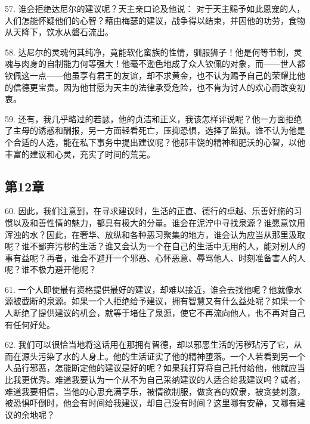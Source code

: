 57. 谁会拒绝达尼尔的建议呢？天主亲口论及他说： 对于天主赐予如此恩宠的人，人们怎能怀疑他们的心智？藉由梅瑟的建议，战争得以结束，并因他的功劳，食物从天降下，饮水从磐石流出。\par

58. 达尼尔的灵魂何其纯净，竟能软化蛮族的性情，驯服狮子！他是何等节制，灵魂与肉身的自制能力何等强大！他毫不逊色地成了众人钦佩的对象，而——世人都钦佩这一点——他虽享有君王的友谊，却不求黄金，也不认为赐予自己的荣耀比他的信德更宝贵。因为他甘愿为天主的法律承受危险，也不肯为讨人的欢心而改变初衷。\par

59. 还有，我几乎略过的若瑟，他的贞洁和正义，我该怎样评说呢？他一方面拒绝了主母的诱惑和酬报，另一方面轻看死亡，压抑恐惧，选择了监狱。谁不认为他是个合适的人选，能在私下事务中提出建议呢？他那丰饶的精神和肥沃的心智，以他丰富的建议和心灵，充实了时间的荒芜。\par


\subsection{第12章}

\par

60. 因此，我们注意到，在寻求建议时，生活的正直、德行的卓越、乐善好施的习惯以及和善性情的魅力，都具有极大的分量。谁会在泥泞中寻找泉源？谁愿意饮用浑浊的水？因此，在奢华、放纵和各种恶习聚集的地方，谁会认为应当从那里汲取呢？谁不鄙弃污秽的生活？谁又会认为一个在自己的生活中无用的人，能对别人的事有益呢？再者，谁会不避开一个邪恶、心怀恶意、辱骂他人、时刻准备害人的人呢？谁不极力避开他呢？\par

61. 一个人即使最有资格提供最好的建议，却难以接近，谁会去找他呢？他就像水源被截断的泉源。如果一个人拒绝给予建议，拥有智慧又有什么益处呢？如果一个人断绝了提供建议的机会，就等于堵住了泉源，使它不再流向他人，也不再对自己有任何好处。\par

62. 我们可以很恰当地将这话用在那拥有智德，却以邪恶生活的污秽玷污了它，从而在源头污染了水的人身上。他的生活证实了他的精神堕落。一个人若看到另一个人品行邪恶，怎能断定他的建议是好的呢？如果我打算将自己托付给他，他就应当比我更优秀。难道我要认为一个从不为自己采纳建议的人适合给我建议吗？或者，难道我要相信，当他的心思充满享乐，被情欲制服，做贪吝的奴隶，被贪婪刺激，被恐惧吓倒时，他会有时间给我建议，却自己没有时间？这里哪有安静，又哪有建议的余地呢？\par

